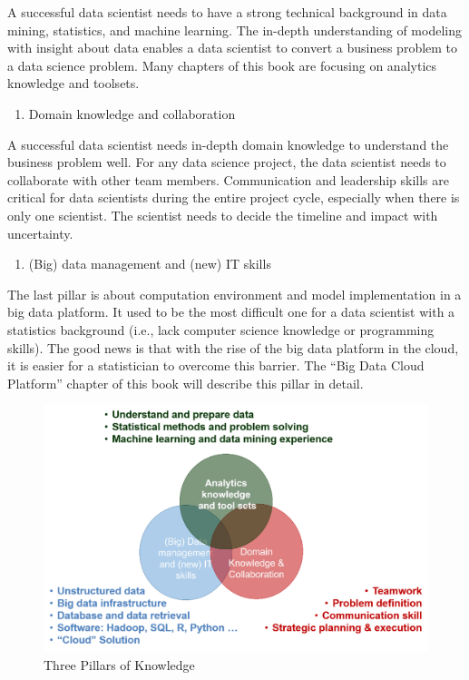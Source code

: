 \documentclass[12pt,]{krantz}
\providecommand{\tightlist}{%
  \setlength{\itemsep}{0pt}\setlength{\parskip}{0pt}}
\begin{document}
A successful data scientist needs to have a strong technical background in data mining, statistics, and machine learning. The in-depth understanding of modeling with insight about data enables a data scientist to convert a business problem to a data science problem. Many chapters of this book are focusing on analytics knowledge and toolsets.

\begin{enumerate}
\def\labelenumi{(\arabic{enumi})}
\setcounter{enumi}{1}
\tightlist
\item
  Domain knowledge and collaboration
\end{enumerate}

A successful data scientist needs in-depth domain knowledge to understand the business problem well. For any data science project, the data scientist needs to collaborate with other team members. Communication and leadership skills are critical for data scientists during the entire project cycle, especially when there is only one scientist. The scientist needs to decide the timeline and impact with uncertainty.

\begin{enumerate}
\def\labelenumi{(\arabic{enumi})}
\setcounter{enumi}{2}
\tightlist
\item
  (Big) data management and (new) IT skills
\end{enumerate}

The last pillar is about computation environment and model implementation in a big data platform. It used to be the most difficult one for a data scientist with a statistics background (i.e., lack computer science knowledge or programming skills). The good news is that with the rise of the big data platform in the cloud, it is easier for a statistician to overcome this barrier. The ``Big Data Cloud Platform'' chapter of this book will describe this pillar in detail.

\begin{figure}

{\centering \includegraphics[width=0.8\linewidth]{images/softskill2} 

}

\caption{Three Pillars of Knowledge}\label{fig:threepillars}
\end{figure}
\end{document}
